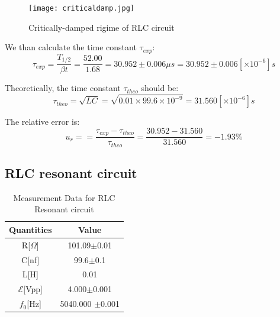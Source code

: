 \documentclass[12pt,a4paper]{article}
\begin{document}
\begin{figure}[H]
    \centering
    \texttt{[image: criticaldamp.jpg]}
    \caption{Critically-damped rigime of RLC circuit}
\end{figure}

We than calculate the time constant $\tau_{exp}$:
$$\tau_{exp}=\frac{T_{1/2}}{\beta t}=\frac{52.00}{1.68}=30.952\pm0.006\mu s=30.952\pm0.006 [\times 10^{-6}]s$$

Theoretically, the time constant ${\tau}_{theo}$ should be:
$${\tau}_{theo}=\sqrt{LC}=\sqrt{0.01\times 99.6\times 10^{-9}}=31.560[\times 10^{-6}]s$$

The relative error is:
$$u_r==\frac{\tau_{exp}-\tau_{theo}}{\tau_{theo}}=\frac{30.952-31.560}{31.560}=-1.93\%$$

\subsection{RLC resonant circuit}
\begin{table}[H]
    \centering
    \begin{tabular}{|c|c|}
    \hline
    Quantities             & Value              \\ \hline
    R{[}$\Omega${]}        & 101.09$\pm$0.01    \\ \hline
    C{[}nf{]}              & 99.6$\pm$0.1       \\ \hline
    L{[}H{]}              & 0.01       \\ \hline
    $\mathcal{E}${[}Vpp{]} & 4.000$\pm$0.001    \\ \hline
    $f_0${[}Hz{]}          & 5040.000 $\pm$0.001    \\ \hline
    \end{tabular}
    \caption{Measurement Data for RLC Resonant circuit}
\end{table}
\end{document}
